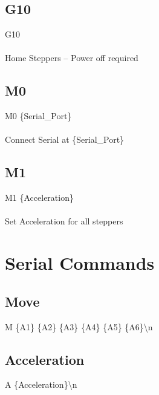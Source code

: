 \documentclass{article}
\begin{document}
\subsection{G10}
G10 \\ \\
Home Steppers -- Power off required

\subsection{M0}
M0 \{Serial\_Port\} \\ \\
Connect Serial at \{Serial\_Port\}

\subsection{M1}
M1 \{Acceleration\} \\ \\
Set Acceleration for all steppers



\newpage
\section{Serial Commands}
\subsection{Move}
{M \{A1\} \{A2\} \{A3\} \{A4\} \{A5\} \{A6\}\textbackslash n}

\subsection{Acceleration}
{A \{Acceleration\}\textbackslash n}
\end{document}
